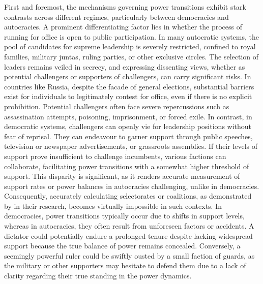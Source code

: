 \documentclass[
  12pt,
  a4paper,
  12pt]{article}
\begin{document}
First and foremost, the mechanisms governing power transitions exhibit
stark contrasts across different regimes, particularly between
democracies and autocracies. A prominent differentiating factor lies in
whether the process of running for office is open to public
participation. In many autocratic systems, the pool of candidates for
supreme leadership is severely restricted, confined to royal families,
military juntas, ruling parties, or other exclusive circles. The
selection of leaders remains veiled in secrecy, and expressing
dissenting views, whether as potential challengers or supporters of
challengers, can carry significant risks. In countries like Russia,
despite the facade of general elections, substantial barriers exist for
individuals to legitimately contest for office, even if there is no
explicit prohibition. Potential challengers often face severe
repercussions such as assassination attempts, poisoning, imprisonment,
or forced exile. In contrast, in democratic systems, challengers can
openly vie for leadership positions without fear of reprisal. They can
endeavour to garner support through public speeches, television or
newspaper advertisements, or grassroots assemblies. If their levels of
support prove insufficient to challenge incumbents, various factions can
collaborate, facilitating power transitions with a somewhat higher
threshold of support. This disparity is significant, as it renders
accurate measurement of support rates or power balances in autocracies
challenging, unlike in democracies. Consequently, accurately calculating
selectorates or coalitions, as demonstrated by
\citet{buenodemesquita2003} in their research, becomes virtually
impossible in such contexts. In democracies, power transitions typically
occur due to shifts in support levels, whereas in autocracies, they
often result from unforeseen factors or accidents. A dictator could
potentially endure a prolonged tenure despite lacking widespread support
because the true balance of power remains concealed. Conversely, a
seemingly powerful ruler could be swiftly ousted by a small faction of
guards, as the military or other supporters may hesitate to defend them
due to a lack of clarity regarding their true standing in the power
dynamics.
\end{document}
